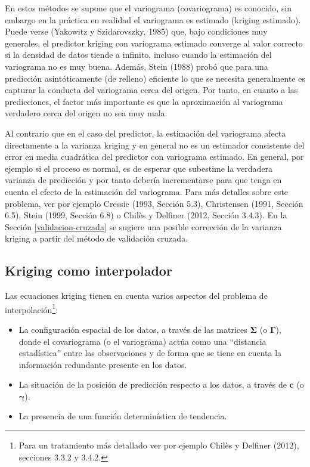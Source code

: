 \documentclass[
  spanish,
]{book}
\providecommand{\tightlist}{%
  \setlength{\itemsep}{0pt}\setlength{\parskip}{0pt}}
\theoremstyle{break}
\theoremstyle{definition}
\theoremstyle{definition}
\theoremstyle{definition}
\theoremstyle{definition}
\theoremstyle{remark}
\begin{document}
En estos métodos se supone que el variograma (covariograma) es conocido, sin embargo en la práctica en realidad el variograma es estimado (kriging estimado).
Puede verse (Yakowitz y Szidarovszky, 1985) que, bajo condiciones muy generales, el predictor kriging con variograma estimado converge al valor correcto si la densidad de datos tiende a infinito, incluso cuando la estimación del variograma no es muy buena.
Además, Stein (1988) probó que para una predicción asintóticamente (de relleno) eficiente lo que se necesita generalmente es capturar la conducta del variograma cerca del origen.
Por tanto, en cuanto a las predicciones, el factor más importante es que la aproximación al variograma
verdadero cerca del origen no sea muy mala.

Al contrario que en el caso del predictor, la estimación del
variograma afecta directamente a la varianza kriging y en general no es un estimador consistente del error en media cuadrática del predictor con variograma estimado.
En general, por ejemplo si el proceso es normal, es de esperar que subestime la verdadera varianza de predicción y por tanto debería incrementarse para que tenga en cuenta el efecto de la estimación del variograma.
Para más detalles sobre este problema, ver por ejemplo Cressie (1993, Sección 5.3), Christensen (1991, Sección 6.5), Stein (1999, Sección 6.8) o Chilès y Delfiner (2012, Sección 3.4.3).
En la Sección \ref{validacion-cruzada} se sugiere una posible corrección de la varianza kriging a partir del método de validación cruzada.

\hypertarget{kriging-interpolador}{%
\subsection{Kriging como interpolador}\label{kriging-interpolador}}

Las ecuaciones kriging tienen en cuenta varios aspectos del problema de interpolación\footnote{Para un tratamiento más detallado ver por ejemplo Chilès y Delfiner (2012), secciones 3.3.2 y 3.4.2.}:

\begin{itemize}
\tightlist
\item
  La configuración espacial de los datos, a través de las matrices \(\boldsymbol{\Sigma}\) (o \(\boldsymbol{\Gamma}\)), donde el covariograma (o el variograma) actúa como una ``distancia estadística'' entre las observaciones y de forma que se tiene en cuenta la información redundante presente en los datos.
\item
  La situación de la posición de predicción respecto a los datos, a través
  de \(\mathbf{c}\) (o \(\boldsymbol{\gamma}\)).
\item
  La presencia de una función determinística de tendencia.
\end{itemize}
\end{document}
